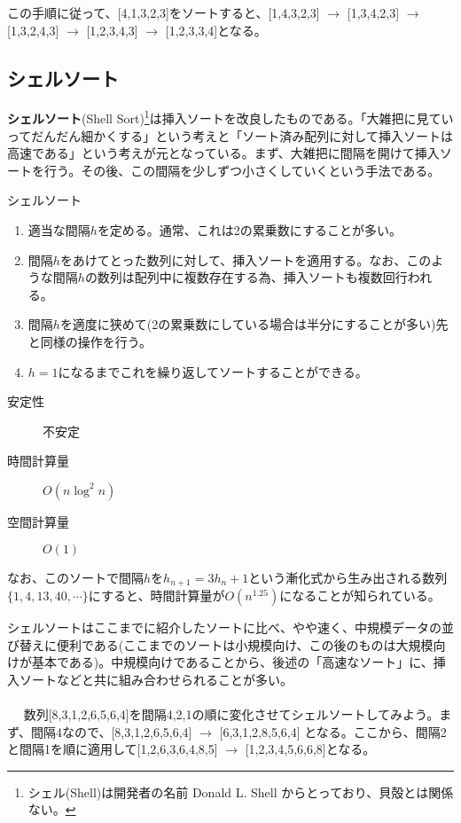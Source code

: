 この手順に従って、[4,1,3,2,3]をソートすると、[1,4,3,2,3] $\rightarrow$ [1,3,4,2,3] $\rightarrow$ [1,3,2,4,3] $\rightarrow$ [1,2,3,4,3] $\rightarrow$ [1,2,3,3,4]となる。

\subsection{シェルソート}
\textbf{シェルソート}(Shell Sort)\footnote{シェル(Shell)は開発者の名前 Donald L. Shell からとっており、貝殻とは関係ない。}は挿入ソートを改良したものである。「大雑把に見ていってだんだん細かくする」という考えと「ソート済み配列に対して挿入ソートは高速である」という考えが元となっている。まず、大雑把に間隔を開けて挿入ソートを行う。その後、この間隔を少しずつ小さくしていくという手法である。
\begin{itembox}[l]{シェルソート}
\begin{enumerate}
\item 適当な間隔$h$を定める。通常、これは2の累乗数にすることが多い。
\item 間隔$h$をあけてとった数列に対して、挿入ソートを適用する。なお、このような間隔$h$の数列は配列中に複数存在する為、挿入ソートも複数回行われる。
\item 間隔$h$を適度に狭めて(2の累乗数にしている場合は半分にすることが多い)先と同様の操作を行う。
\item $h=1$になるまでこれを繰り返してソートすることができる。
\end{enumerate}
\begin{multicols}{3}
\begin{description}
\item[安定性] 不安定
\item[時間計算量] $O(n \log^2 n)$
\item[空間計算量] $O(1)$
\end{description}
\end{multicols}
\end{itembox}

なお、このソートで間隔$h$を$h_{n+1}=3h_n+1$という漸化式から生み出される数列$\{1,4,13,40,\cdots\}$にすると、時間計算量が$O(n^{1.25})$になることが知られている。

シェルソートはここまでに紹介したソートに比べ、やや速く、中規模データの並び替えに便利である(ここまでのソートは小規模向け、この後のものは大規模向けが基本である)。中規模向けであることから、後述の「高速なソート」に、挿入ソートなどと共に組み合わせられることが多い。
\\ \\　
数列[8,3,1,2,6,5,6,4]を間隔4,2,1の順に変化させてシェルソートしてみよう。まず、間隔4なので、[8,3,1,2,6,5,6,4] $\rightarrow$ [6,3,1,2,8,5,6,4] となる。ここから、間隔2と間隔1を順に適用して[1,2,6,3,6,4,8,5] $\rightarrow$ [1,2,3,4,5,6,6,8]となる。

